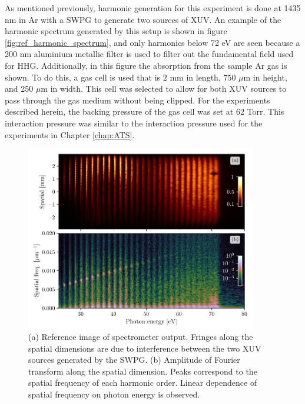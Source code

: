 As mentioned previously, harmonic generation for this experiment is done at 1435 nm in Ar with a SWPG to generate two sources of XUV.  An example of the harmonic spectrum generated by this setup is shown in figure \ref{fig:ref_harmonic_spectrum}, and only harmonics below 72 eV are seen because a 200 nm aluminium metallic filter is used to filter out the fundamental field used for HHG.  Additionally, in this figure the absorption from the sample Ar gas is shown. To do this, a gas cell is used that is 2 mm in length, 750 $\mu$m in height, and 250 $\mu$m in width.  This cell was selected to allow for both XUV sources to pass through the gas medium without being clipped.  For the experiments described herein, the backing pressure of the gas cell was set at 62 Torr.  This interaction pressure was similar to the interaction pressure used for the experiments in Chapter \ref{chap:ATS}.

\begin{figure}
	\centering
	\includegraphics[width=0.9\textwidth]{figures/CATS/ref_image_FFT.pdf}
	\caption[Reference camera image and spatial Fourier transform used in CATS]{(a) Reference image of spectrometer output.  Fringes along the spatial dimensions are due to interference between the two XUV sources generated by the SWPG. (b) Amplitude of Fourier transform along the spatial dimension. Peaks correspond to the spatial frequency of each harmonic order.  Linear dependence of spatial frequency on photon energy is observed.}
	\label{fig:ref_image_FFT}
\end{figure}

